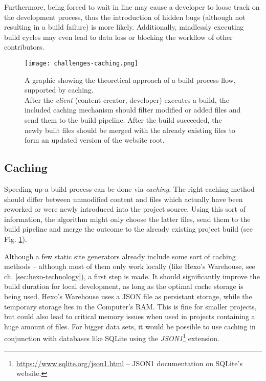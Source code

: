 Furthermore, being forced to wait in line may cause a developer to loose track on the development process, thus the introduction of hidden bugs (although not resulting in a build failure) is more likely. Additionally, mindlessly executing build cycles may even lead to data loss or blocking the workflow of other contributors.

\begin{figure} %
    \centering
    \texttt{[image: challenges-caching.png]}
    \caption{A graphic showing the theoretical approach of a build process flow, supported by caching.\\
    After the \emph{client} (content creator, developer) executes a build, the included caching mechanism should filter modified or added files and send them to the build pipeline. After the build succeeded, the newly built files should be merged with the already existing files to form an updated version of the website root.}
    \label{fig:caching}
\end{figure}
%

\subsection{Caching}
\label{sec:challenges-caching}
Speeding up a build process can be done via \emph{caching}. The right caching method should differ between unmodified content and files which actually have been reworked or were newly introduced into the project source. Using this sort of information, the algorithm might only choose the latter files, send them to the build pipeline and merge the outcome to the already existing project build (see Fig. \ref{fig:caching}).

Although a few static site generators already include some sort of caching methods -- although most of them only work locally (like Hexo's Warehouse, see ch. \ref{sec:hexo-technology}), a first step is made. It should significantly improve the build duration for local development, as long as the optimal cache storage is being used. Hexo's Warehouse uses a JSON file as persistant storage, while the temporary storage lies in the Computer's RAM. This is fine for smaller projects, but could also lead to critical memory issues when used in projects containing a huge amount of files. For bigger data sets, it would be possible to use caching in conjunction with databases like SQLite using the \emph{JSON1}\footnote{\url{https://www.sqlite.org/json1.html} -- JSON1 documentation on SQLite's website.} extension.

